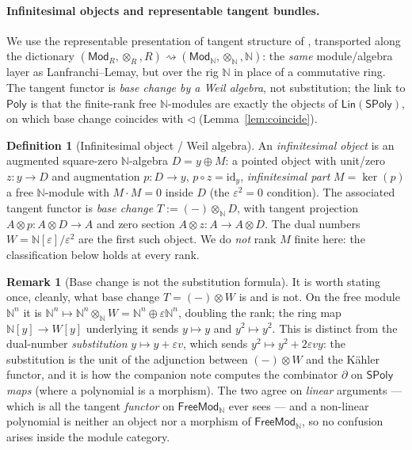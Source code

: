 \documentclass[11pt]{article}
\theoremstyle{definition}
\newtheorem{definition}[theorem]{Definition}
\newtheorem{remark}[theorem]{Remark}
\newcommand{\SPoly}{\mathsf{SPoly}}
\newcommand{\Lin}{\mathsf{Lin}}
\newcommand{\FreeMod}{\mathsf{FreeMod}}
\newcommand{\Poly}{\mathsf{Poly}}
\newcommand{\Mod}{\mathsf{Mod}}
\newcommand{\N}{\mathbb{N}}
\newcommand{\id}{\mathrm{id}}
\renewcommand{\ker}{\operatorname{ker}}
\begin{document}
\paragraph{Infinitesimal objects and representable tangent bundles.}
We use the representable presentation of tangent structure of \cite{LanfranchiLemay2025},
transported along the dictionary $(\Mod_R,\otimes_R,R)\rightsquigarrow(\Mod_\N,\otimes_\N,\N)$: the
\emph{same} module/algebra layer as Lanfranchi--Lemay, but over the rig $\N$ in place of a
commutative ring. The tangent functor is \emph{base change by a Weil algebra}, not substitution; the
link to $\Poly$ is that the finite-rank free $\N$-modules are exactly the objects of
$\Lin(\SPoly)$, on which base change coincides with $\lhd$ (Lemma~\ref{lem:coincide}).

\begin{definition}[Infinitesimal object / Weil algebra]\label{def:inf}
An \emph{infinitesimal object} is an augmented square-zero $\N$-algebra $D=y\oplus M$: a pointed
object with unit/zero $z\colon y\to D$ and augmentation $p\colon D\to y$, $p\circ z=\id_y$,
\emph{infinitesimal part} $M=\ker(p)$ a free $\N$-module with $M\cdot M=0$ inside $D$ (the
$\varepsilon^2=0$ condition). The associated tangent functor is \emph{base change}
$T:=(-)\otimes_\N D$, with tangent projection $A\otimes p\colon A\otimes D\to A$ and zero section
$A\otimes z\colon A\to A\otimes D$. The dual numbers $W=\N[\varepsilon]/\varepsilon^2$ are the first
such object. We do \emph{not} rank $M$ finite here: the classification below holds at every rank.
\end{definition}

\begin{remark}[Base change is not the substitution formula]\label{rem:basechange}
It is worth stating once, cleanly, what base change $T=(-)\otimes W$ is and is not. On the free module
$\N^n$ it is $\N^n\mapsto\N^n\otimes_\N W=\N^n\oplus\varepsilon\N^n$, doubling the rank; the ring map
$\N[y]\to W[y]$ underlying it sends $y\mapsto y$ and $y^2\mapsto y^2$. This is distinct from the
dual-number \emph{substitution} $y\mapsto y+\varepsilon v$, which sends $y^2\mapsto y^2+2\varepsilon
vy$: the substitution is the unit of the adjunction between $(-)\otimes W$ and the K\"ahler functor,
and it is how the companion note \cite{MacBethTangent} computes the combinator $\partial$ on $\SPoly$
\emph{maps} (where a polynomial is a morphism). The two agree on \emph{linear} arguments --- which is
all the tangent \emph{functor} on $\FreeMod_\N$ ever sees --- and a non-linear polynomial is neither
an object nor a morphism of $\FreeMod_\N$, so no confusion arises inside the module category.
\end{remark}
\end{document}
